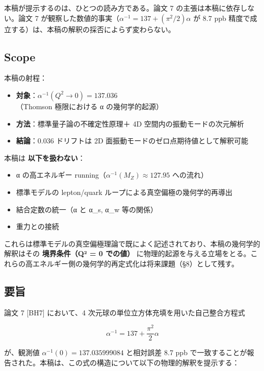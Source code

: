 \documentclass[
  11pt]{ltjsarticle}
\providecommand{\tightlist}{%
  \setlength{\itemsep}{0pt}\setlength{\parskip}{0pt}}
\begin{document}
本稿が提示するのは、ひとつの読み方である。論文 7
の主張は本稿に依存しない。論文 7
が観察した数値的事実（\(\alpha^{-1} = 137 + (\pi^2/2)\alpha\) が 8.7 ppb
精度で成立する）は、本稿の解釈の採否によらず変わらない。

\subsection{Scope}\label{scope}

本稿の射程：

\begin{itemize}
\tightlist
\item
  \textbf{対象}：\(\alpha^{-1}(Q^2 \to 0) = 137.036\)（Thomson
  極限における α の幾何学的起源）
\item
  \textbf{方法}：標準量子論の不確定性原理＋ 4D
  空間内の振動モードの次元解析
\item
  \textbf{結論}：0.036 ドリフトは 2D
  面振動モードのゼロ点期待値として解釈可能
\end{itemize}

本稿は \textbf{以下を扱わない}：

\begin{itemize}
\tightlist
\item
  α の高エネルギー running（\(\alpha^{-1}(M_Z) \approx 127.95\)
  への流れ）
\item
  標準モデルの lepton/quark ループによる真空偏極の幾何学的再導出
\item
  結合定数の統一（α と α\_s, α\_w 等の関係）
\item
  重力との接続
\end{itemize}

これらは標準モデルの真空偏極理論で既によく記述されており、本稿の幾何学的解釈はその
\textbf{境界条件（Q² = 0 での値）}
に物理的起源を与える立場をとる。これらの高エネルギー側の幾何学的再定式化は将来課題（§8）として残す。

\subsection{要旨}\label{ux8981ux65e8}

論文 7 {[}BH7{]} において、4
次元球の単位立方体充填を用いた自己整合方程式

\[\alpha^{-1} = 137 + \frac{\pi^2}{2}\alpha\]

が、観測値 \(\alpha^{-1}(0) = 137.035999084\) と相対誤差 8.7 ppb
で一致することが報告された。本稿は、この式の構造について以下の物理的解釈を提示する：
\end{document}
